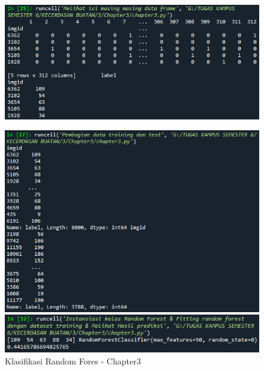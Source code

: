 \begin{enumerate}
\begin{figure}[ht]
              \centerline{\includegraphics[scale=0.7]{figures/chapter3-4g.png}}
          \end{figure}
          \newpage
          \begin{figure}[ht]
              \centerline{\includegraphics[scale=0.7]{figures/chapter3-4h.png}}
              \centerline{\includegraphics[scale=0.7]{figures/chapter3-4i.png}}
              \caption{Klasifikasi Random Fores - Chapter3}
              \label{Klasifikasi Random Fores - Chapter3}
          \end{figure}
          \newpage


\end{enumerate}
